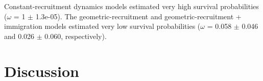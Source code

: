 \documentclass[12pt]{article}
\begin{document}

Constant-recruitment dynamics models estimated very high
survival probabilities ($\omega$ = 1 $\pm$ 1.3e-05). %
The geometric-recruitment and geometric-recruitment + immigration
models estimated very low survival probabilities %
($\omega$ =
0.058 $\pm$ 0.046 and 0.026 $\pm$ 0.060, respectively). 




\section{Discussion}

\end{document}

